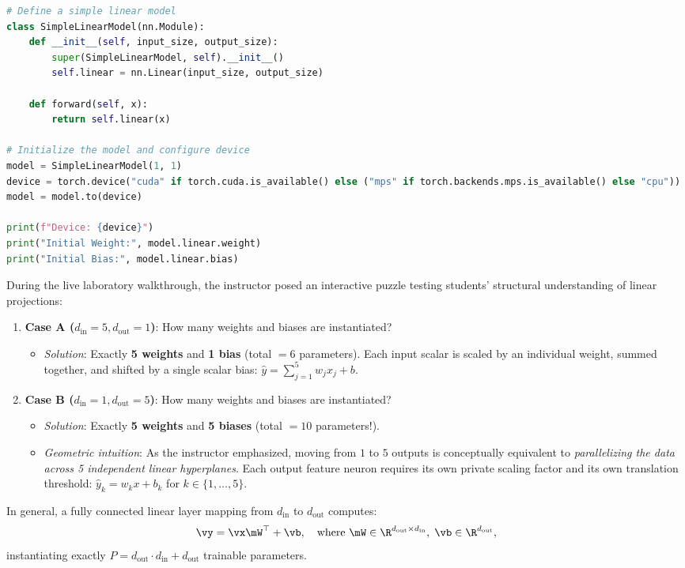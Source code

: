 \documentclass[../labs.tex]{subfiles}
\begin{document}
\begin{lstlisting}[language=Python, caption={Defining a single-input single-output linear model (Cells 11--18).}, label={lst:lab01_simple_linear}]
# Define a simple linear model
class SimpleLinearModel(nn.Module):
    def __init__(self, input_size, output_size):
        super(SimpleLinearModel, self).__init__()
        self.linear = nn.Linear(input_size, output_size)
    
    def forward(self, x):
        return self.linear(x)

# Initialize the model and configure device
model = SimpleLinearModel(1, 1)
device = torch.device("cuda" if torch.cuda.is_available() else ("mps" if torch.backends.mps.is_available() else "cpu"))
model = model.to(device)

print(f"Device: {device}")
print("Initial Weight:", model.linear.weight)
print("Initial Bias:", model.linear.bias)
\end{lstlisting}

\begin{intuition}
During the live laboratory walkthrough, the instructor posed an interactive puzzle testing students' structural understanding of linear projections:
\begin{enumerate}
    \item \textbf{Case A ($d_{\text{in}} = 5, d_{\text{out}} = 1$)}: How many weights and biases are instantiated?
    \begin{itemize}
        \item \emph{Solution}: Exactly \textbf{5 weights} and \textbf{1 bias} (total $= 6$ parameters). Each input scalar is scaled by an individual weight, summed together, and shifted by a single scalar bias: $\hat{y} = \sum_{j=1}^5 w_j x_j + b$.
    \end{itemize}
    \item \textbf{Case B ($d_{\text{in}} = 1, d_{\text{out}} = 5$)}: How many weights and biases are instantiated?
    \begin{itemize}
        \item \emph{Solution}: Exactly \textbf{5 weights} and \textbf{5 biases} (total $= 10$ parameters!).
        \item \emph{Geometric intuition}: As the instructor emphasized, moving from $1$ to $5$ outputs is conceptually equivalent to \emph{parallelizing the data across 5 independent linear hyperplanes}. Each output feature neuron requires its own private scaling factor and its own translation threshold: $\hat{y}_k = w_k x + b_k$ for $k \in \{1, \dots, 5\}$.
    \end{itemize}
\end{enumerate}
In general, a fully connected linear layer mapping from $d_{\text{in}}$ to $d_{\text{out}}$ computes:
\begin{equation}
\vy = \vx \mW^\top + \vb, \quad \text{where } \mW \in \R^{d_{\text{out}} \times d_{\text{in}}}, \; \vb \in \R^{d_{\text{out}}},
\end{equation}
instantiating exactly $P = d_{\text{out}} \cdot d_{\text{in}} + d_{\text{out}}$ trainable parameters.
\end{intuition}
\end{document}
